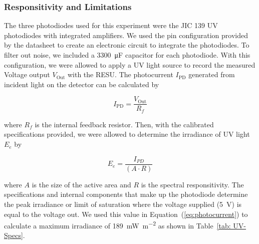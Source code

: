 {	\subsubsection{Responsitivity and Limitations}

	The three photodiodes used for this experiment were the JIC 139 UV photodiodes with integrated amplifiers. We used the pin configuration provided by the datasheet to create an electronic circuit to integrate the photodiodes. To filter out noise, we included a \SI{3300}{\micro\farad} capacitor for each photodiode. With this configuration, we were allowed to apply a UV light source to record the measured Voltage output $V_{\text{Out}}$ with the RESU. The photocurrent $I_{\text{PD}}$ generated from incident light on the detector can be calculated by


	\begin{equation}
	I_{\text{PD}} = \frac{V_{\text{Out}}}{R_{f}}
	\label{eq:photocurrent}
	\end{equation}


	where $R_{f}$ is the internal feedback resistor. Then, with the calibrated specifications provided, we were allowed to determine the irradiance of UV light $E_{e}$ by
	
	\begin{equation}
	E_{e} = \frac{I_{PD}}{(A \cdot R)}
	\end{equation}
	

	where ${A}$ is the size of the active area and ${R}$ is the spectral responsitivity. The specifications and internal components that make up the photodiode determine the peak irradiance or limit of saturation where the voltage supplied (\SI{5}{\volt}) is equal to the voltage out. We used this value in Equation~(\ref{eq:photocurrent}) to calculate a maximum irradiance of \SI{189}{\milli\watt\per\square\meter} as shown in Table~\ref{tab: UV-Specs}.


}
